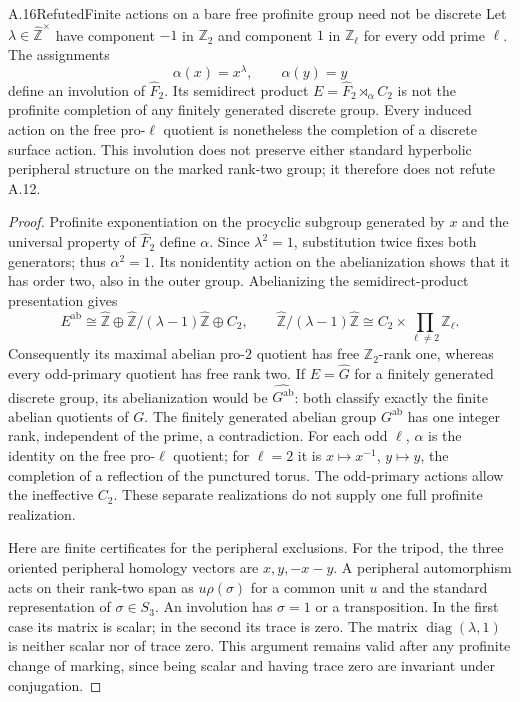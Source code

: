 \begin{statement}{A.16}{Refuted}{Finite actions on a bare free profinite group need not be discrete}
Let $\lambda\in\widehat{\mathbb Z}^{\times}$ have component $-1$
in $\mathbb Z_2$ and component $1$ in $\mathbb Z_\ell$ for every
odd prime $\ell$. The assignments
\[
 \alpha(x)=x^\lambda,\qquad \alpha(y)=y
\]
define an involution of $\widehat F_2$. Its semidirect product
$E=\widehat F_2\rtimes_\alpha C_2$ is not the profinite completion
of any finitely generated discrete group. Every induced action on
the free pro-$\ell$ quotient is nonetheless the completion of a
discrete surface action. This involution does not preserve either
standard hyperbolic peripheral structure on the marked rank-two
group; it therefore does not refute A.12.
\end{statement}
\begin{proof}
Profinite exponentiation on the procyclic subgroup generated by $x$
and the universal property of $\widehat F_2$ define $\alpha$.
Since $\lambda^2=1$, substitution twice fixes both generators;
thus $\alpha^2=1$. Its nonidentity action on the abelianization
shows that it has order two, also in the outer group. Abelianizing
the semidirect-product presentation gives
\[
 E^{\mathrm{ab}}\cong
 \widehat{\mathbb Z}\oplus
 \widehat{\mathbb Z}/(\lambda-1)\widehat{\mathbb Z}\oplus C_2,
 \qquad
 \widehat{\mathbb Z}/(\lambda-1)\widehat{\mathbb Z}
 \cong C_2\times\prod_{\ell\ne2}\mathbb Z_\ell.
\]
Consequently its maximal abelian pro-$2$ quotient has free
$\mathbb Z_2$-rank one, whereas every odd-primary quotient has
free rank two. If $E=\widehat G$ for a finitely generated discrete
group, its abelianization would be $\widehat{G^{\mathrm{ab}}}$:
both classify exactly the finite abelian quotients of $G$.
The finitely generated abelian group $G^{\mathrm{ab}}$ has one
integer rank, independent of the prime, a contradiction.
For each odd $\ell$, $\alpha$ is the identity on the free
pro-$\ell$ quotient; for $\ell=2$ it is $x\mapsto x^{-1}$,
$y\mapsto y$, the completion of a reflection of the punctured
torus. The odd-primary actions allow the ineffective $C_2$.
These separate realizations do not supply one full profinite
realization.

Here are finite certificates for the peripheral exclusions.
For the tripod, the three oriented peripheral homology vectors
are $x,y,-x-y$. A peripheral automorphism acts on their rank-two
span as $u\rho(\sigma)$ for a common unit $u$ and the standard
representation of $\sigma\in S_3$. An involution has
$\sigma=1$ or a transposition. In the first case its matrix is
scalar; in the second its trace is zero. The matrix
$\operatorname{diag}(\lambda,1)$ is neither scalar nor of trace
zero. This argument remains valid after any profinite change of
marking, since being scalar and having trace zero are invariant
under conjugation.


\end{proof}
